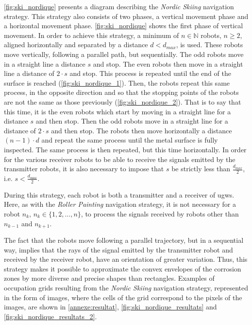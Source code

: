 \ref{fig:ski_nordique} presents a diagram describing the \textit{Nordic Skiing} navigation strategy.
This strategy also consists of two phases, a vertical movement phase and a horizontal movement phase.
\ref{fig:ski_nordique} shows the first phase of vertical movement.
In order to achieve this strategy, a minimum of $n \in \mathbb{N}$ robots, $n \ge 2$, aligned horizontally and separated by a distance $d < d_{max}$, is used.
These robots move vertically, following a parallel path, but sequentially.
The odd robots move in a straight line a distance $s$ and stop.
The even robots then move in a straight line a distance of $2 \cdot s$ and stop.
This process is repeated until the end of the surface is reached (\ref{fig:ski_nordique_1}).
Then, the robots repeat this same process, in the opposite direction and so that the stopping points of the robots are not the same as those previously (\ref{fig:ski_nordique_2}).
That is to say that this time, it is the even robots which start by moving in a straight line for a distance $s$ and then stop.
Then the odd robots move in a straight line for a distance of $2 \cdot s$ and then stop.
The robots then move horizontally a distance $(n - 1) \cdot d$ and repeat the same process until the metal surface is fully inspected.
The same process is then repeated, but this time horizontally.
In order for the various receiver robots to be able to receive the signals emitted by the transmitter robots, it is also necessary to impose that $s$ be strictly less than $\frac{d_{max}}{2}$, i.e. $s < \frac{d_ {max}}{2}$.

During this strategy, each robot is both a transmitter and a receiver of \gls{ugw}s.
Here, as with the \textit{Roller Painting} navigation strategy, it is not necessary for a robot $n_k$, $n_k \in \{1, 2, \dots, n\}$, to process the signals received by robots other than $n_{k-1}$ and $n_{k+1}$.

The fact that the robots move following a parallel trajectory, but in a sequential way, implies that the rays of the signal emitted by the transmitter robot and received by the receiver robot, have an orientation of greater variation.
Thus, this strategy makes it possible to approximate the convex envelopes of the corrosion zones by more diverse and precise shapes than rectangles.
Examples of occupation grids resulting from the \textit{Nordic Skiing} navigation strategy, represented in the form of images, where the cells of the grid correspond to the pixels of the images, are shown in \ref{annexe:resultat}, \ref{fig:ski_nordique_resultats} and \ref{fig:ski_nordique_resultats_2}.

